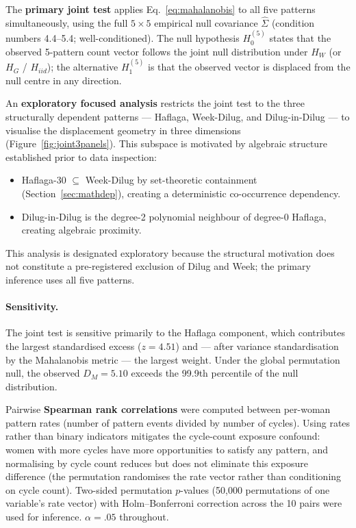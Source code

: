 \documentclass[12pt]{article}
\begin{document}
The \textbf{primary joint test} applies Eq.~\ref{eq:mahalanobis} to all five patterns simultaneously, using the full $5\times5$ empirical null covariance $\hat{\Sigma}$ (condition numbers 4.4--5.4; well-conditioned). The null hypothesis $H_0^{(5)}$ states that the observed 5-pattern count vector follows the joint null distribution under $H_W$ (or $H_G$ / $H_{iid}$); the alternative $H_1^{(5)}$ is that the observed vector is displaced from the null centre in any direction.

An \textbf{exploratory focused analysis} restricts the joint test to the three structurally dependent patterns --- Haflaga, Week-Dilug, and Dilug-in-Dilug --- to visualise the displacement geometry in three dimensions (Figure~\ref{fig:joint3panels}). This subspace is motivated by algebraic structure established prior to data inspection:
\begin{itemize}
  \item Haflaga-30 $\subseteq$ Week-Dilug by set-theoretic containment
    (Section~\ref{sec:mathdep}), creating a deterministic co-occurrence dependency.
  \item Dilug-in-Dilug is the degree-2 polynomial neighbour of degree-0 Haflaga,
    creating algebraic proximity.
\end{itemize}
This analysis is designated exploratory because the structural motivation does not constitute a pre-registered exclusion of Dilug and Week; the primary inference uses all five patterns.

\paragraph{Sensitivity.}
The joint test is sensitive primarily to the Haflaga component, which contributes
the largest standardised excess ($z = 4.51$) and --- after variance standardisation
by the Mahalanobis metric --- the largest weight. Under the global permutation null,
the observed $D_M = 5.10$ exceeds the 99.9th percentile of the null distribution.

Pairwise \textbf{Spearman rank correlations} were computed between per-woman
pattern rates (number of pattern events divided by number of cycles). Using rates
rather than binary indicators mitigates the cycle-count exposure confound: women
with more cycles have more opportunities to satisfy any pattern, and normalising
by cycle count reduces but does not eliminate this exposure difference (the permutation
randomises the rate vector rather than conditioning on cycle count). Two-sided permutation $p$-values
(50,000 permutations of one variable's rate vector) with Holm--Bonferroni correction
across the 10 pairs were used for inference. $\alpha = .05$ throughout.
\end{document}
